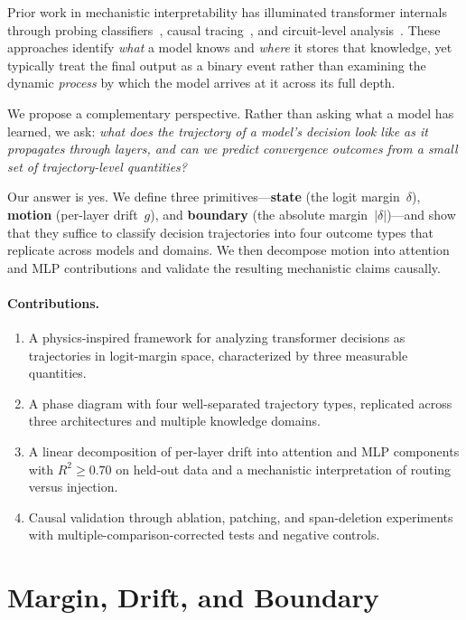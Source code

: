 \documentclass{article}
\begin{document}
Prior work in mechanistic interpretability has illuminated transformer internals through probing classifiers~\cite{belinkov2022}, causal tracing~\cite{meng2022}, and circuit-level analysis~\cite{olsson2022,conmy2023}.
These approaches identify \emph{what} a model knows and \emph{where} it stores that knowledge, yet typically treat the final output as a binary event rather than examining the dynamic \emph{process} by which the model arrives at it across its full depth.

We propose a complementary perspective.  Rather than asking what a model has learned, we ask: \emph{what does the trajectory of a model's decision look like as it propagates through layers, and can we predict convergence outcomes from a small set of trajectory-level quantities?}

Our answer is yes.  We define three primitives---\textbf{state} (the logit margin~$\delta$), \textbf{motion} (per-layer drift~$g$), and \textbf{boundary} (the absolute margin~$|\delta|$)---and show that they suffice to classify decision trajectories into four outcome types that replicate across models and domains.  We then decompose motion into attention and MLP contributions and validate the resulting mechanistic claims causally.

\paragraph{Contributions.}
\begin{enumerate}
\item A physics-inspired framework for analyzing transformer decisions as trajectories in logit-margin space, characterized by three measurable quantities.
\item A phase diagram with four well-separated trajectory types, replicated across three architectures and multiple knowledge domains.
\item A linear decomposition of per-layer drift into attention and MLP components with $R^2 \geq 0.70$ on held-out data and a mechanistic interpretation of routing versus injection.
\item Causal validation through ablation, patching, and span-deletion experiments with multiple-comparison-corrected tests and negative controls.
\end{enumerate}


\section{Margin, Drift, and Boundary}
\label{sec:primitives}
\end{document}
